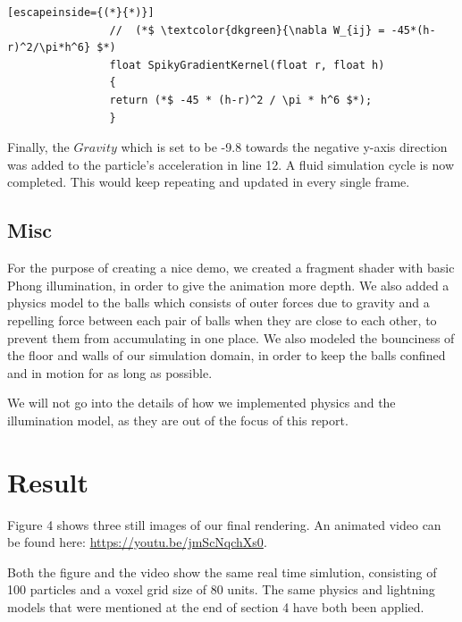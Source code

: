 \documentclass{article}
\begin{document}
\begin{multicols}{2}
			\noindent
	        \begin{minipage}{\linewidth}
	        	\begin{lstlisting}[escapeinside={(*}{*)}]
	        	//  (*$ \textcolor{dkgreen}{\nabla W_{ij} = -45*(h-r)^2/\pi*h^6} $*)
	        	float SpikyGradientKernel(float r, float h)
	        	{
	        	return (*$ -45 * (h-r)^2 / \pi * h^6 $*);
	        	}
	        	\end{lstlisting}
	        \end{minipage}
        
        	Finally, the $Gravity$ which is set to be -9.8 towards the negative y-axis direction was added to the particle's acceleration in line 12. A fluid simulation cycle is now completed. This would keep repeating and updated in every single frame. 

        \subsection{Misc}
            For the purpose of creating a nice demo, we created a fragment shader with basic Phong illumination, in order to give the animation more depth.
            We also added a physics model to the balls which consists of outer forces due to gravity and a repelling force between each pair of balls when they are close to each other, to prevent them from accumulating in one place.
            We also modeled the bounciness of the floor and walls of our simulation domain, in order to keep the balls confined and in motion for as long as possible.

            We will not go into the details of how we implemented physics and the illumination model, as they are out of the focus of this report.

    \section{Result}
        Figure 4 shows three still images of our final rendering. 
        An animated video can be found here:
        \url{https://youtu.be/jmScNqchXs0}.

        Both the figure and the video show the same real time simlution, consisting of 100 particles and a voxel grid size of 80 units.
        The same physics and lightning models that were mentioned at the end of section 4 have both been applied.


\end{multicols}
\end{document}
